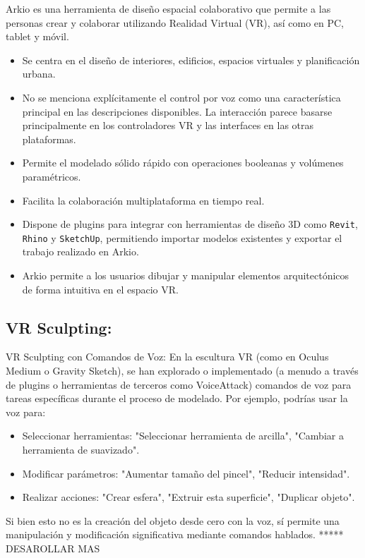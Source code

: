 \documentclass[a4paper, 12pt]{book}
\begin{document}
Arkio es una herramienta de diseño espacial colaborativo que permite a las personas crear y colaborar utilizando Realidad Virtual (VR), así como en PC, tablet y móvil.

\begin{itemize}
  \item Se centra en el diseño de interiores, edificios, espacios virtuales y planificación urbana.
  
  \item No se menciona explícitamente el control por voz como una característica principal en las descripciones disponibles. La interacción parece basarse principalmente en los controladores VR y las interfaces en las otras plataformas.
  
  \item Permite el modelado sólido rápido con operaciones booleanas y volúmenes paramétricos.
  
  \item Facilita la colaboración multiplataforma en tiempo real.
  
  \item Dispone de plugins para integrar con herramientas de diseño 3D como \texttt{Revit}, \texttt{Rhino} y \texttt{SketchUp}, permitiendo importar modelos existentes y exportar el trabajo realizado en Arkio.
  
  \item Arkio permite a los usuarios dibujar y manipular elementos arquitectónicos de forma intuitiva en el espacio VR.
\end{itemize}

\subsection{VR Sculpting:}
VR Sculpting con Comandos de Voz: En la escultura VR (como en Oculus Medium o Gravity Sketch), se han explorado o implementado (a menudo a través de plugins o herramientas de terceros como VoiceAttack) comandos de voz para tareas específicas durante el proceso de modelado. Por ejemplo, podrías usar la voz para:
\begin{itemize}
    \item Seleccionar herramientas: "Seleccionar herramienta de arcilla", "Cambiar a herramienta de suavizado".
    \item Modificar parámetros: "Aumentar tamaño del pincel", "Reducir intensidad".
    \item Realizar acciones: "Crear esfera", "Extruir esta superficie", "Duplicar objeto".
\end{itemize}
Si bien esto no es la creación del objeto desde cero con la voz, sí permite una manipulación y modificación significativa mediante comandos hablados.
***** DESAROLLAR MAS
\end{document}
